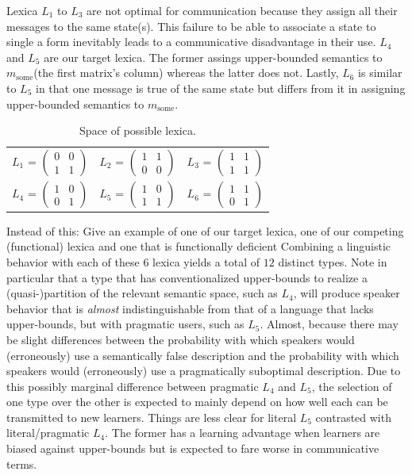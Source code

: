 \documentclass[a4paper]{article}
\newcommand{\hl}[1]{\textcolor[rgb]{.8,.33,.0}{#1}}%
\newcommand{\messg}{\ensuremath{m}\xspace}		%
\newcommand{\mymessg}[1]{\ensuremath{\messg_{\text{#1}}}\xspace} %
\newcommand{\msome}{\mymessg{some}}
\begin{document}
Lexica $L_1$ to $L_3$ are not optimal for communication because they assign all their messages to the same state(s). This failure to be able to associate a state to single a form inevitably leads to a communicative disadvantage in their use. $L_4$ and $L_5$ are our target lexica. The former assings upper-bounded semantics to \msome (the first matrix's column) whereas the latter does not. Lastly, $L_6$ is similar to $L_5$ in that one message is true of the same state but differs from it in assigning upper-bounded semantics to \msome. 

\begin{table}[t]
\centering 
\begin{tabular}{l c l}
$L_1$ = $\begin{pmatrix} 0 & 0 \\ 1 & 1 \end{pmatrix}$ & 
$L_2$ = $\begin{pmatrix} 1 & 1 \\ 0 & 0 \end{pmatrix}$ & 
$L_3$ = $\begin{pmatrix} 1 & 1 \\ 1 & 1 \end{pmatrix}$\\[0.5cm]

$L_4$ = $\begin{pmatrix} 1 & 0 \\ 0 & 1 \end{pmatrix}$ &
$L_5$ = $\begin{pmatrix} 1 & 0 \\ 1 & 1 \end{pmatrix}$ &
$L_6$ = $\begin{pmatrix} 1 & 1 \\ 0 & 1 \end{pmatrix}$
\end{tabular}
\caption{Space of possible lexica.}
\label{tab:lexica}
\end{table}


\hl{Instead of this: Give an example of one of our target lexica, one of our competing (functional) lexica and one that is functionally deficient} Combining a linguistic behavior with each of these $6$ lexica yields a total of $12$ distinct types. Note in particular  that a type that has conventionalized upper-bounds to realize a (quasi-)partition of the relevant semantic space, such as $L_4$, will produce speaker behavior that is {\em almost} indistinguishable from that of a language that lacks upper-bounds, but with pragmatic users, such as $L_5$. Almost, because there may be slight differences between the probability with which speakers would (erroneously) use a semantically false description and the probability with which speakers would (erroneously) use a pragmatically suboptimal description. Due to this possibly marginal difference between pragmatic $L_4$ and $L_5$, the selection of one type over the other is expected to mainly depend on how well each can be transmitted to new learners. Things are less clear for literal $L_5$ contrasted with literal/pragmatic $L_4$. The former has a learning advantage when learners are biased against upper-bounds but is expected to fare worse in communicative terms.
\end{document}
